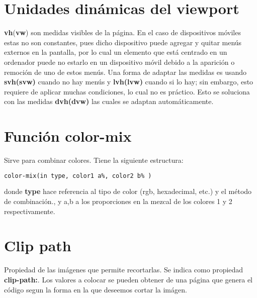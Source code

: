 \documentclass[10pt,oneside]{article}
\begin{document}
\begin{multicols}{2}
\section{Unidades dinámicas del viewport}

    \textbf{vh}(\textbf{vw}) son medidas visibles de la página. En el caso de dispositivos móviles estas no son constantes, pues dicho dispositivo puede agregar y quitar menús externos en la pantalla, por lo cual un elemento que está centrado en un ordenador  puede no estarlo en un dispositivo móvil debido a la aparición o remoción de uno de estos menús. Una forma de adaptar las medidas es usando \textbf{svh(svw)} cuando no hay menús y \textbf{lvh(lvw)} cuando si lo hay; sin embargo, esto requiere de aplicar muchas condiciones, lo cual no es práctico. Esto se soluciona con las medidas \textbf{dvh(dvw)} las cuales se adaptan automáticamente.  
 
\section{Función color-mix}

    Sirve para combinar colores. Tiene la siguiente estructura:
    
    \begin{lstlisting}[language=HTML]
color-mix(in type, color1 a%, color2 b% )       
    \end{lstlisting}
\end{multicols}   

    donde \textbf{type} hace referencia al tipo de color (rgb, hexadecimal, etc.) y el método de combinación., y a,b a los proporciones en la mezcal de los colores 1 y 2 respectivamente.

\section{Clip path}

    Propiedad de las imágenes que permite recortarlas. Se indica como propiedad \textbf{clip-path:}. Los valores a colocar se pueden obtener de una página que genera el código segun la forma en la que deseemos cortar la imágen. 
    
 
    
\end{document}
